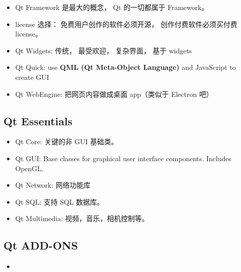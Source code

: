 
\begin{issues}
\issueDraft
\end{issues}

\begin{itemize}
\item Qt Framework 是最大的概念， Qt 的一切都属于 Framework。
\item license 选择： 免费用户创作的软件必须开源， 创作付费软件必须买付费 license。
\item Qt Widgets: 传统， 最受欢迎， 复杂界面， 基于 widgets
\item Qt Quick: use \textbf{QML (Qt Meta-Object Language)} and JavaScript to create GUI
\item Qt WebEngine: 把网页内容做成桌面 app（类似于 Electron 吧）
\end{itemize}


\subsection{Qt Essentials}
\begin{itemize}
\item Qt Core: 关键的非 GUI 基础类。
\item Qt GUI: Base classes for graphical user interface components. Includes OpenGL.
\item Qt Network: 网络功能库
\item Qt SQL: 支持 SQL 数据库。
\item Qt Multimedia: 视频，音乐，相机控制等。
\end{itemize}

\subsection{Qt ADD-ONS}
\begin{itemize}
\item 
\end{itemize}
